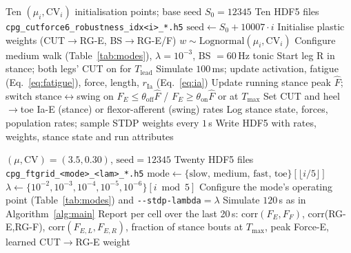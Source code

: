\begin{algorithm}[h]
\caption{Initialisation robustness --- force-triggered medium walk over ten
$(\mu,\mathrm{CV})$ initialisations (\texttt{run\_cutforce\_sweep6.sh}).}\label{alg:main}
\begin{algorithmic}[1]
\Require Ten $(\mu_i,\mathrm{CV}_i)$ initialisation points; base seed $S_0=12345$
\Ensure Ten HDF5 files \texttt{cpg\_cutforce6\_robustness\_idx<i>\_*.h5}
  \State $\text{seed} \gets S_0 + 10007 \cdot i$
  \State Initialise plastic weights (CUT$\to$RG-E, BS$\to$RG-E/F) $w \sim \mathrm{Lognormal}(\mu_i, \mathrm{CV}_i)$
  \State Configure medium walk (Table~\ref{tab:modes}), $\lambda=10^{-3}$, BS $=60$\,Hz tonic
  \State Start leg R in stance; both legs' CUT on for $T_{\text{lead}}$
    \State Simulate $100$\,ms; update activation, fatigue (Eq.~\ref{eq:fatigue}), force, length, $r_{\text{Ia}}$ (Eq.~\ref{eq:ia})
      \State Update running stance peak $\hat F$; switch stance$\leftrightarrow$swing on
             $F_E \le \theta_{\text{off}}\hat F$ / $F_E \ge \theta_{\text{on}}\hat F$ or at $T_{\max}$
      \State Set CUT and heel$\to$toe Ia-E (stance) or flexor-afferent (swing) rates
    \EndFor
    \State Log stance state, forces, population rates; sample STDP weights every $1$\,s
  \EndFor
  \State Write HDF5 with rates, weights, stance state and run attributes
\EndFor
\end{algorithmic}
\end{algorithm}

\begin{algorithm}[h]
\caption{Locomotion-mode $\times$ learning-rate grid (\texttt{run\_forcetrig\_grid.sh}).}\label{alg:grid}
\begin{algorithmic}[1]
\Require $(\mu, \mathrm{CV}) = (3.5, 0.30)$, $\mathrm{seed} = 12345$
\Ensure Twenty HDF5 files \texttt{cpg\_ftgrid\_<mode>\_<lam>\_*.h5}
  \State $\mathrm{mode} \gets \{\text{slow, medium, fast, toe}\}[\lfloor i / 5 \rfloor]$
  \State $\lambda \gets \{10^{-2},10^{-3},10^{-4},10^{-5},10^{-6}\}[i \bmod 5]$
  \State Configure the mode's operating point (Table~\ref{tab:modes}) and \verb|--stdp-lambda|$=\lambda$
  \State Simulate $120$\,s as in Algorithm~\ref{alg:main}
\EndFor
\State Report per cell over the last 20\,s: corr$(F_E,F_F)$, corr(RG-E,RG-F),
       corr$(F_{E,L},F_{E,R})$, fraction of stance bouts at $T_{\max}$, peak Force-E,
       learned CUT$\to$RG-E weight
\end{algorithmic}
\end{algorithm}
